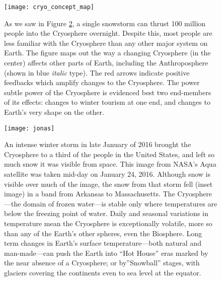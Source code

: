 \begin{figure}[p]
\centering
\texttt{[image: cryo\_concept\_map]}%
\caption{As we saw in Figure \ref{fig:jonas}, a single snowstorm can thrust 100 million people into the Cryosphere overnight. Despite this, most people are less familiar with the Cryosphere than any other major system on Earth. The figure maps out the way a changing Cryosphere (in the center) affects other parts of Earth, including the Anthroposphere (shown in blue \textit{italic} type). The red arrows indicate positive feedbacks which amplify changes to the Cryosphere. The power subtle power of the Cryosphere is evidenced best two end-members of its effects: changes to winter tourism at one end, and changes to Earth's very shape on the other.} 
\label{fig:cryo_concept_map}
\end{figure}

\begin{figure}%
\centering
\texttt{[image: jonas]}%
\caption{An intense winter storm in late January of 2016 brought the Cryosphere to a third of the people in the United States, and left so much snow it was visible from space. This image from NASA's Aqua satellite was taken mid-day on January 24, 2016. Although snow is visible over much of the image, the snow from that storm fell (inset image) in a band from Arkansas to Massachusetts. The Cryosphere---the domain of frozen water---is stable only where temperatures are below the freezing point of water. Daily and seasonal variations in temperature mean the Cryosphere is exceptionally volatile, more so than any of the Earth's other spheres, even the Biosphere. Long term changes in Earth's surface temperature---both natural and man-made---can push the Earth into ``Hot House'' eras marked by the near absence of a Cryosphere; or by''Snowball'' stages, with glaciers covering the continents even to sea level at the equator.} 
\label{fig:jonas}
\end{figure} 

